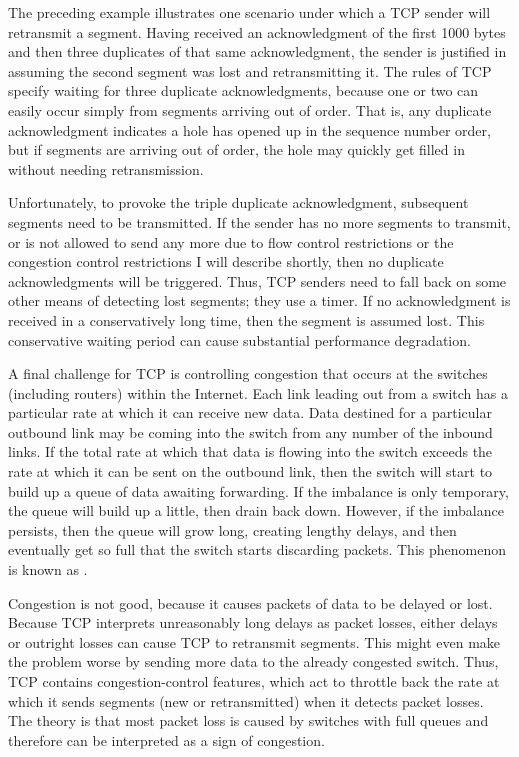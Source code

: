The preceding example illustrates one scenario under which a TCP
sender will retransmit a segment.  Having received an acknowledgment
of the first 1000 bytes and then three duplicates of that same
acknowledgment, the sender is justified in assuming the second segment
was lost and retransmitting it.  The rules of TCP specify waiting for
three duplicate acknowledgments, because one or two can easily occur
simply from segments arriving out of order.  That is, any duplicate
acknowledgment indicates a hole has opened up in the sequence number
order, but if segments are arriving out of order, the hole may quickly
get filled in without needing retransmission.

Unfortunately, to provoke the triple duplicate acknowledgment,
subsequent segments need to be transmitted.  If the sender has no more
segments to transmit, or is not allowed to send any more due to flow
control restrictions or the congestion control restrictions I will
describe shortly, then no duplicate acknowledgments will be triggered.
Thus, TCP senders need to fall back on some other means of detecting
lost segments; they use a timer.  If no acknowledgment is received in
a conservatively long time, then the segment is assumed lost.  This
conservative waiting period can cause substantial performance
degradation.

A final challenge for TCP is controlling congestion that occurs at the
switches (including routers) within the Internet.  Each link leading
out from a switch has a particular rate at which it can receive new
data.  Data destined for a particular outbound link may be coming into
the switch from any number of the inbound links.  If the total rate at
which that data is flowing into the switch exceeds the rate at which
it can be sent on the outbound link, then the switch will start to
build up a queue of data awaiting forwarding.  If the imbalance is
only temporary, the queue will build up a little, then drain back
down.  However, if the imbalance persists, then the queue will grow
long, creating lengthy delays, and then eventually get so full that
the switch starts discarding packets.  This phenomenon is known as
.

Congestion is not good, because it causes packets of data to be delayed
or lost.  Because TCP interprets unreasonably long delays as packet
losses, either delays or outright losses can cause TCP to retransmit
segments.  This might even make the problem worse by sending more
data to the already congested switch.  Thus, TCP contains
congestion-control features, which act to throttle back the rate at
which it sends segments (new or retransmitted) when it detects packet
losses.  The theory is that most packet loss is caused by switches
with full queues and therefore can be interpreted as a sign of
congestion.

